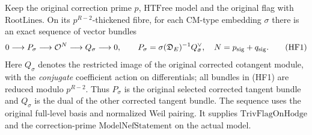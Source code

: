 \begin{theorem}
\label{thm:exact-corrected-flag-sequence}
Keep the original correction prime \(p\), \(\mathrm{HTFree}\) model
and the original flag with \(\mathrm{RootLines}\). On its
\(p^{R-2}\)-thickened fibre, for each CM-type embedding \(\sigma\)
there is an exact sequence of vector bundles
\[
 0\longrightarrow P_\sigma
 \longrightarrow \mathcal O^{N}
 \longrightarrow Q_\sigma
 \longrightarrow0,
 \qquad
 P_\sigma=\sigma(\mathfrak D_E)^{-1}
                  Q_{\bar\sigma}^{\vee},\quad N=p_{\rm sig}+q_{\rm sig}.
 \tag{HF1}
\]
Here \(Q_\sigma\) denotes the restricted image of the original
corrected cotangent module, with the \emph{conjugate} coefficient
action on differentials; all bundles in (HF1) are reduced modulo
\(p^{R-2}\). Thus \(P_\sigma\) is the original selected corrected
tangent bundle and \(Q_\sigma\) is the dual of the other corrected
tangent bundle. The sequence uses the original full-level basis
and normalized Weil pairing. It supplies \(\mathrm{TrivFlagOnHodge}\)
and the correction-prime \(\mathrm{ModelNefStatement}\) on the
actual model.
\end{theorem}

